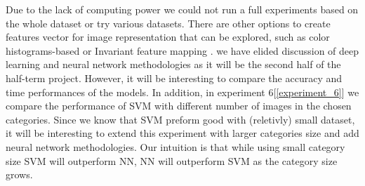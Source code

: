 Due to the lack of computing power we could not run a full experiments based on the whole dataset or try various datasets. There are other options to create features vector for image representation that can be explored, such as color histograms-based or Invariant feature mapping \cite{lampert2009kernel}. 
we have elided discussion of deep learning and neural network methodologies as it will be the second half of the half-term project. However, it will be interesting to compare the accuracy and time performances of the models. In addition, in experiment 6[\ref{experiment_6}] we compare the performance of SVM with different number of images in the chosen categories. Since we know that SVM preform good with (reletivly) small dataset, it will be interesting to extend this experiment with larger categories size and add neural network methodologies. Our intuition is that while using small category size SVM will outperform NN, NN will outperform SVM as the category size grows.